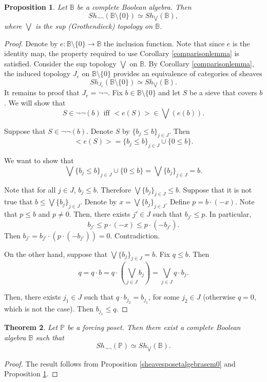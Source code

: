 \documentclass[10pt,longbibliography]{article}
\newtheorem{Theo}{Theorem}[section]
\newtheorem{Prop}[Theo]{Proposition}
\newcommand{\Po}{\mathbb{P}}
\newcommand{\B}{\mathbb{B}}
\begin{document}
\begin{Prop}\label{sheavesnegationandsup}
	Let $\B$ be a complete Boolean algebra. Then
	$$Sh_{\neg \neg}(\B \setminus{\{0\}}) \simeq Sh_{\bigvee}(\B),$$
	where $\bigvee$ is the sup (Grothendieck) topology on $\B$.
\end{Prop}
\begin{proof}
	Denote by $e: \B \setminus \{ 0 \} \to \B$ the inclusion function. Note that since $e$ is the identity map, the property required to use Corollary \ref{comparisonlemma} is satisfied. Consider the sup topology $\bigvee$ on $\B$. By Corollary \ref{comparisonlemma}, the induced topology $J_{e}$ on $\B \setminus \{ 0\}$ provides an equivalence of categories of sheaves 
	$$Sh_{J_{e}}(\B \setminus \{0\}) \simeq Sh_{\bigvee}(\B).$$
	It remains to proof that $J_{e} = \neg \neg$. Fix $b \in \B \setminus \{ 0\}$ and let $S$ be a sieve that covers $b$. We will show that
	$$S \in \neg \neg(b) \text{ iff } <e(S)> \in \bigvee (e(b)).$$
	
	Suppose that $S \in \neg \neg (b)$. Denote $S$ by $ \{b_{j} \leq b\}_{j \in J}$. Then 
	$$<e(S)> = \{b_{j} \leq b\}_{j \in J} \cup \{0 \leq b\}. $$
	
	We want to show that 
	$$\bigvee \{b_{j} \leq b\}_{j \in J}\cup \{ 0 \leq b\} = \bigvee \{b_{j}\}_{j \in J} = b.$$
	
	Note that for all $j \in J$, $b_{j} \leq b$.  Therefore $\bigvee \{b_{j}\}_{j \in J} \leq b$. Suppose that it is not true that $b \leq \bigvee \{b_{j}\}_{j \in J}$. Denote by $x = \bigvee \{b_{j}\}_{j \in J}.$ Define $p = b \cdot (-x).$ Note that $p \leq b$ and $p \neq 0$. Then, there exists $j' \in J$ such that $b_{j'} \leq p$. In particular,
	$$b_{j'} \leq p \cdot (-x) \leq p \cdot (-b_{j'}).$$
	Then $b_{j'} = b_{j'}\cdot(p\cdot(-b_{j'})) = 0$. Contradiction. 
	
	On the other hand, suppose that $\bigvee\{b_{j}\}_{j \in J} = b.$ Fix $q \leq b$. Then
	$$q = q \cdot b = q \cdot(\underset{j \in J}{\bigvee}b_{j}) = \underset{j \in J}{\bigvee} q \cdot b_{j}.$$
	
	Then, there exists $j_{1} \in J$ such that $q \cdot b_{j_{2}} = b_{j_{1}}$, for some $j_{2} \in J$ (otherwise $q = 0$, which is not the case). Then $b_{j_{1}} \leq q$.
\end{proof}

\begin{Theo}\label{HugoMicheltheorem2}
	Let $\Po$ be a forcing poset. Then there exist a complete Boolean algebra $\B$ such that
	$$Sh_{\neg \neg}(\Po) \simeq Sh_{\bigvee}( \mathbb B).$$
\end{Theo}
\begin{proof}
	The result follows from Proposition \ref{sheavesposetalgebrasem0} and Proposition \ref{sheavesnegationandsup}.
\end{proof}
\end{document}
